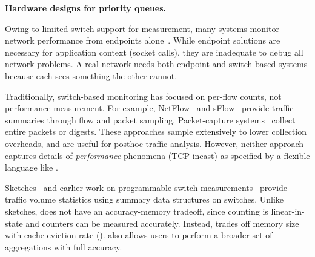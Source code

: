 \medskip
\noindent
\textbf{Hardware designs for priority queues.}

 Owing to limited switch support for
measurement, many systems monitor network performance from endpoints
alone~\cite{netpoirot, minlan-snap, dapper-sosr, trumpet, azure-smartnic}.
While endpoint solutions are necessary for application context (\eg socket
calls), they are inadequate to debug all network problems. A real network needs
both endpoint and switch-based systems because each sees something the other
cannot.

 Traditionally, switch-based monitoring has
focused on per-flow counts, not performance measurement. For example,
NetFlow~\cite{netflow} and sFlow~\cite{sflow} provide traffic summaries
through flow and packet sampling. Packet-capture systems~\cite{cisco-span,
niksun, netsight, everflow, pathdump, path_query} collect entire packets or
digests. These approaches sample extensively to lower collection
overheads, and are useful for posthoc traffic analysis. However, neither
approach captures details of {\em performance} phenomena (\eg TCP incast) as
specified by a flexible language like \TheSystem.

 Sketches~\cite{univmon, flowradar, counterbraids, dream} and
earlier work on programmable switch measurements~\cite{progme, opensketch}
provide traffic volume statistics using summary data structures on switches.
Unlike sketches, \TheSystem does not have an accuracy-memory tradeoff, since
counting is linear-in-state and counters can be measured accurately. Instead,
\TheSystem trades off memory size with cache eviction rate ().
\TheSystem also allows users to perform a broader set of aggregations with full
accuracy.

